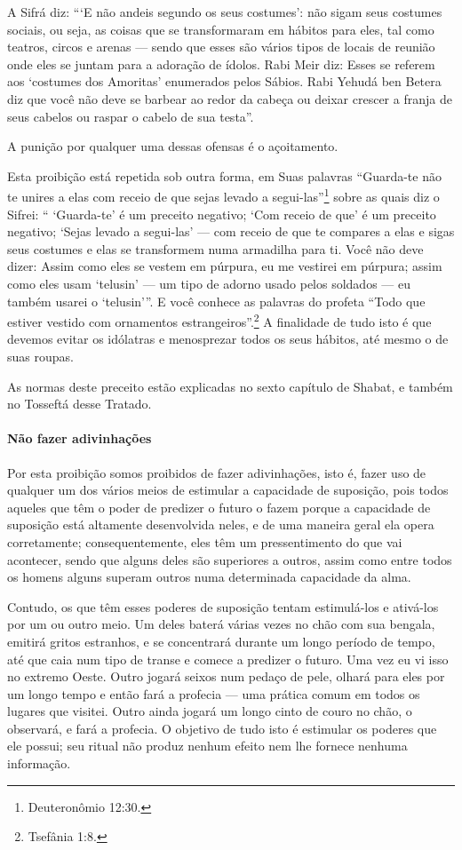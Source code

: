 A Sifrá diz: ```E não andeis segundo os seus costumes': não sigam seus
costumes sociais, ou seja, as coisas que se transformaram em hábitos
para eles, tal como teatros, circos e arenas --- sendo que esses são
vários tipos de locais de reunião onde eles se juntam para a adoração de
ídolos. Rabi Meir diz: Esses se referem aos `costumes dos Amoritas'
enumerados pelos Sábios. Rabi Yehudá ben Betera diz que você não deve se
barbear ao redor da cabeça ou deixar crescer a franja de seus cabelos ou
raspar o cabelo de sua testa''.

A punição por qualquer uma dessas ofensas é o açoitamento.

Esta proibição está repetida sob outra forma, em Suas palavras
``Guarda-te não te unires a elas com receio de que sejas levado a
segui-las''\footnote{Deuteronômio 12:30.} sobre as quais diz o Sifrei: ``
`Guarda-te' é um preceito negativo; `Com receio de que' é um preceito
negativo; `Sejas levado a segui-las' --- com receio de que te compares a
elas e sigas seus costumes e elas se transformem numa armadilha para ti.
Você não deve dizer: Assim como eles se vestem em púrpura, eu me
vestirei em púrpura; assim como eles usam `telusin' --- um tipo de
adorno usado pelos soldados --- eu também usarei o `telusin'''. E você
conhece as palavras do profeta ``Todo que estiver vestido com ornamentos
estrangeiros''.\footnote{Tsefânia 1:8.} A finalidade de tudo isto é que
devemos evitar os idólatras e menosprezar todos os seus hábitos, até
mesmo o de suas roupas.

As normas deste preceito estão explicadas no sexto capítulo de Shabat, e
também no Tosseftá desse Tratado.

\paragraph{Não fazer adivinhações}

Por esta proibição somos proibidos de fazer adivinhações, isto é, fazer
uso de qualquer um dos vários meios de estimular a capacidade de
suposição, pois todos aqueles que têm o poder de predizer o futuro o
fazem porque a capacidade de suposição está altamente desenvolvida
neles, e de uma maneira geral ela opera corretamente; consequentemente,
eles têm um pressentimento do que vai acontecer, sendo que alguns deles
são superiores a outros, assim como entre todos os homens alguns superam
outros numa determinada capacidade da alma.

Contudo, os que têm esses poderes de suposição tentam estimulá-los e
ativá-los por um ou outro meio. Um deles baterá várias vezes no chão com
sua bengala, emitirá gritos estranhos, e se concentrará durante um longo
período de tempo, até que caia num tipo de transe e comece a predizer o
futuro. Uma vez eu vi isso no extremo Oeste. Outro jogará seixos num
pedaço de pele, olhará para eles por um longo tempo e então fará a
profecia --- uma prática comum em todos os lugares que visitei. Outro
ainda jogará um longo cinto de couro no chão, o observará, e fará a
profecia. O objetivo de tudo isto é estimular os poderes que ele
possui; seu ritual não produz nenhum efeito nem lhe fornece nenhuma
informação.


